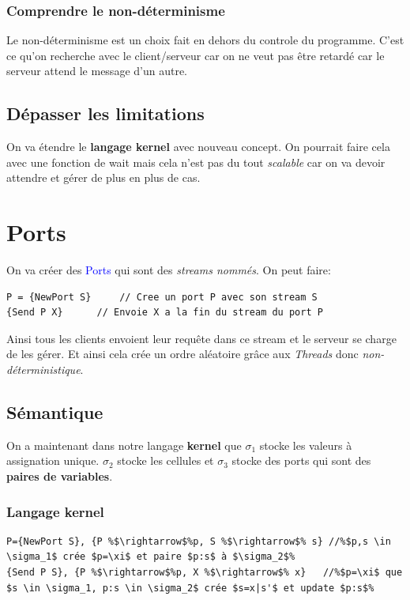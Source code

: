 \documentclass{report}
\begin{document}
\subsubsection{Comprendre le non-déterminisme} 
Le non-déterminisme est un choix fait en dehors du controle du programme. C'est ce qu'on recherche avec le client/serveur car on ne veut pas être retardé car le serveur attend le message d'un autre.

\subsection{Dépasser les limitations}
On va étendre le \textbf{langage kernel} avec nouveau concept. On pourrait faire cela avec une fonction de wait mais cela n'est pas du tout \textit{scalable} car on va devoir attendre et gérer de plus en plus de cas.

\section{Ports}
On va créer des \textcolor{blue}{Ports} qui sont des \textit{streams nommés}. On peut faire:
\begin{lstlisting}[escapechar=\%]
P = {NewPort S} 	// Cree un port P avec son stream S
{Send P X}	 	// Envoie X a la fin du stream du port P
\end{lstlisting}
Ainsi tous les clients envoient leur requête dans ce stream et le serveur se charge de les gérer. Et ainsi cela crée un ordre aléatoire grâce aux \textit{Threads} donc \textit{non-déterministique}.

\subsection{Sémantique}
On a maintenant dans notre langage \textbf{kernel} que $\sigma_1$ stocke les valeurs à assignation unique. $\sigma_2$ stocke les cellules et $\sigma_3$ stocke des ports qui sont des \textbf{paires de variables}.

\subsubsection{Langage kernel}
\begin{lstlisting}[escapechar=\%]
P={NewPort S}, {P %$\rightarrow$%p, S %$\rightarrow$% s} //%$p,s \in \sigma_1$ crée $p=\xi$ et paire $p:s$ à $\sigma_2$%
{Send P S}, {P %$\rightarrow$%p, X %$\rightarrow$% x}	//%$p=\xi$ que $s \in \sigma_1, p:s \in \sigma_2$ crée $s=x|s'$ et update $p:s$%
\end{lstlisting}
\end{document}
